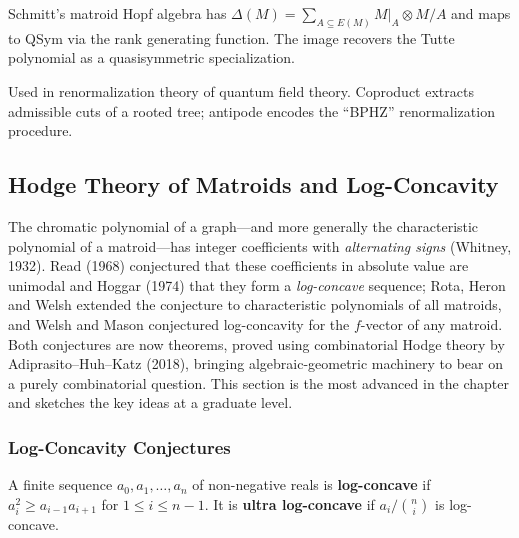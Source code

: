 \begin{example}[Matroids]
Schmitt's matroid Hopf algebra has $\Delta(M) = \sum_{A \subseteq E(M)} M|_A \otimes M/A$
and maps to QSym via the rank generating function. The image recovers
the Tutte polynomial as a quasisymmetric specialization.
\end{example}

\begin{example}
Used in renormalization theory of quantum field theory. Coproduct
extracts admissible cuts of a rooted tree; antipode encodes the
``BPHZ'' renormalization procedure.
\end{example}

\subsection{Hodge Theory of Matroids and Log-Concavity}\label{subsec:hodge}

The chromatic polynomial of a graph---and more generally the
characteristic polynomial of a matroid---has integer coefficients with
\emph{alternating signs} (Whitney, 1932). Read (1968) conjectured that
these coefficients in absolute value are unimodal and Hoggar (1974)
that they form a \emph{log-concave} sequence; Rota, Heron and Welsh
extended the conjecture to characteristic polynomials of all
matroids, and Welsh and Mason conjectured log-concavity for the
$f$-vector of any matroid. Both conjectures are now theorems, proved using
combinatorial Hodge theory by Adiprasito--Huh--Katz (2018), bringing
algebraic-geometric machinery to bear on a purely combinatorial
question. This section is the most advanced in the chapter and
sketches the key ideas at a graduate level.

\subsubsection{Log-Concavity Conjectures}

\begin{definition}
A finite sequence $a_0, a_1, \ldots, a_n$ of non-negative reals is
\textbf{log-concave} if $a_i^2 \ge a_{i-1} a_{i+1}$ for $1 \le i \le n - 1$.
It is \textbf{ultra log-concave} if $a_i / \binom{n}{i}$ is
log-concave.
\end{definition}

